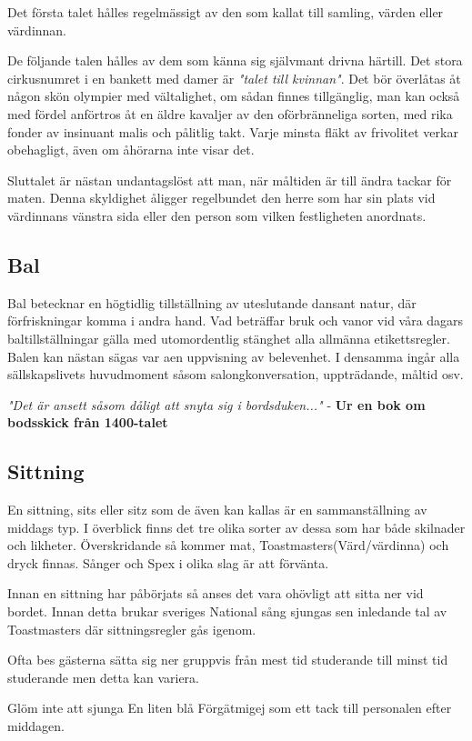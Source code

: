Det första talet hålles regelmässigt av den som kallat till samling, värden eller värdinnan.

De följande talen hålles av dem som känna sig självmant drivna härtill. Det stora cirkusnumret i en bankett med damer är \textit{"talet till kvinnan"}. Det bör överlåtas åt någon skön olympier med vältalighet, om sådan finnes tillgänglig, man kan också med fördel anförtros åt en äldre kavaljer av den oförbränneliga sorten, med rika fonder av insinuant malis och pålitlig takt. Varje minsta fläkt av frivolitet verkar obehagligt, även om åhörarna inte visar det.

Sluttalet är nästan undantagslöst att man, när måltiden är till ändra tackar för maten. Denna skyldighet åligger regelbundet den herre som har sin plats vid värdinnans vänstra sida eller den person som vilken festligheten anordnats.
\filbreak
\subsection{Bal}
Bal betecknar en högtidlig tillställning av uteslutande dansant natur, där förfriskningar komma i andra hand. Vad beträffar bruk och vanor vid våra dagars baltillställningar gälla med utomordentlig stänghet alla allmänna etikettsregler. Balen kan nästan sägas var aen uppvisning av belevenhet. I densamma ingår alla sällskapslivets huvudmoment såsom salongkonversation, uppträdande, måltid osv.

\textit{"Det är ansett såsom dåligt att snyta sig i bordsduken..."} - \textbf{Ur en bok om bodsskick från 1400-talet}
\filbreak
\subsection{Sittning}

En sittning, sits eller sitz som de även kan kallas är en sammanställning av middags typ. I överblick finns det tre olika sorter av dessa som har både skilnader och likheter. Överskridande så kommer mat, Toastmasters(Värd/värdinna) och dryck finnas. Sånger och Spex i olika slag är att förvänta.

Innan en sittning har påbörjats så anses det vara ohövligt att sitta ner vid bordet. Innan detta brukar sveriges National sång sjungas sen inledande tal av Toastmasters där sittningsregler gås igenom. 

Ofta bes gästerna sätta sig ner gruppvis från mest tid studerande till minst tid studerande men detta kan variera.

Glöm inte att sjunga En liten blå Förgätmigej som ett tack till personalen efter middagen.

